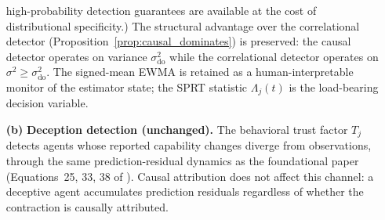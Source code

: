 \begin{proposition}
\begin{enumerate}
    high-probability detection guarantees are available at the cost
    of distributional specificity.) The structural advantage over
    the correlational detector
    (Proposition~\ref{prop:causal_dominates}) is preserved: the
    causal detector operates on variance $\sigma_{\mathrm{do}}^2$
    while the correlational detector operates on $\sigma^2 \geq
    \sigma_{\mathrm{do}}^2$. The signed-mean
    EWMA is retained as a human-interpretable monitor of the
    estimator state; the SPRT statistic $\Lambda_j(t)$ is the
    load-bearing decision variable.
\item[\textbf{(b)}] \textbf{Deception detection (unchanged).} The
    behavioral trust factor $T_j$ detects agents whose reported capability
    changes diverge from observations, through the same prediction-residual
    dynamics as the foundational paper (Equations~25, 33, 38 of
    \citet{lasser2026gfm}). Causal attribution does not affect this channel:
    a deceptive agent accumulates prediction residuals regardless of whether
    the contraction is causally attributed.
\end{enumerate}
\end{proposition}


